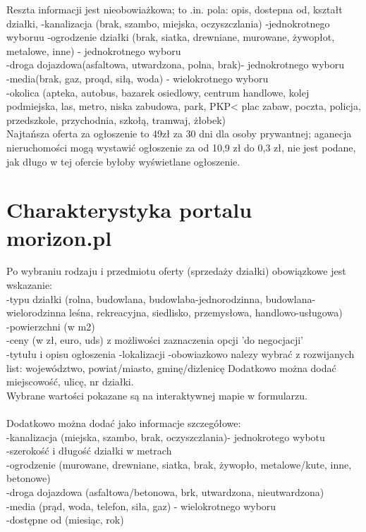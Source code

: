 \documentclass[a4paper,12pt,twoside,openany]{report}
\begin{document}
Reszta informacji jest nieobowiażkowa; to .in. pola:
opis, dostepna od, kształt działki,
-kanalizacja (brak, szambo, miejska, oczyszczlania) -jednokrotnego wyboruu
-ogrodzenie działki (brak, siatka, drewniane, murowane, żywopłot, metalowe, inne) - jednokrotnego wyboru\\
-droga dojazdowa(asfaltowa, utwardzona, polna, brak)- jednokrotnego wyboru\\
-media(brak, gaz, proąd, siłą, woda) - wielokrotnego wyboru\\
-okolica (apteka, autobus, bazarek osiedlowy, centrum handlowe, kolej podmiejska, las, metro, niska zabudowa, park, PKP< plac zabaw, poczta, policja, przedszkole, przychodnia, szkołą, tramwaj, żłobek)\\

Najtańsza oferta za ogłoszenie to 49zł za 30 dni dla osoby prywantnej; aganecja nieruchomości mogą wystawić ogłoszenie za od 10,9 zł do 0,3 zł, nie jest podane, jak długo w tej ofercie byłoby wyświetlane ogłoszenie.


\section{Charakterystyka portalu morizon.pl}
Po wybraniu rodzaju i przedmiotu oferty (sprzedaży działki) obowiązkowe jest wskazanie:\\
-typu działki (rolna, budowlana, budowlaba-jednorodzinna, budowlana-wielorodzinna leśna, rekreacyjna, siedlisko, przemysłowa, handlowo-usługowa)\\

-powierzchni (w m2)\\
-ceny (w zł, euro, uds) z możliwości zaznaczenia opcji 'do negocjacji'\\
-tytułu i opisu ogłoszenia
-lokalizacji -obowiazkowo nalezy wybrać z rozwijanych list: województwo, powiat/miasto, gminę/dizlenicę
Dodatkowo można dodać miejscowość, ulicę, nr działki.\\
Wybrane wartości pokazane są na interaktywnej mapie w formularzu.\\
\\

Dodatkowo można dodać jako informacje szczegółowe:\\
-kanalizacja (miejska, szambo, brak, oczyszczlania)- jednokrotego wybotu\\
-szerokość i długość działki w metrach\\
-ogrodzenie (murowane, drewniane, siatka, brak, żywopło, metalowe/kute, inne, betonowe)\\
-droga dojazdowa (asfaltowa/betonowa, brk, utwardzona, nieutwardzona)\\
-media (prąd, woda, telefon, siła, gaz) - wielokrotnego wyboru\\
-dostępne od (miesiąc, rok)\\
\end{document}
